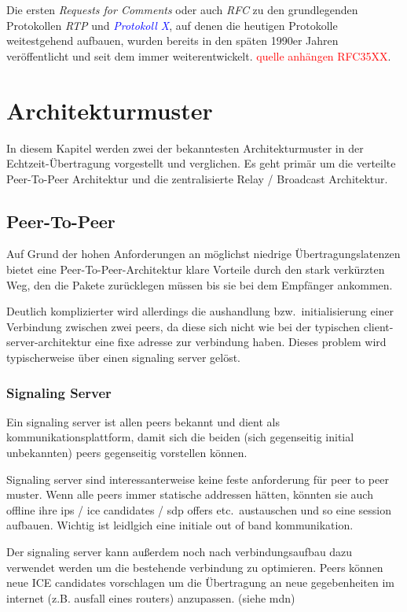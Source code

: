 \documentclass{article}
\begin{document}
\begin{onecolumn}
Die ersten \textit{Requests for Comments} oder auch \textit{RFC} zu
den grundlegenden Protokollen \textit{RTP} und
\textit{\textcolor{blue}{Protokoll X}}, auf denen die heutigen Protokolle
weitestgehend aufbauen, wurden bereits in den späten 1990er Jahren
veröffentlicht und seit dem immer weiterentwickelt. \textcolor{red}{quelle
anhängen RFC35XX}.

\section{Architekturmuster}

In diesem Kapitel werden zwei der bekanntesten Architekturmuster in der
Echtzeit-Übertragung vorgestellt und verglichen. Es geht primär um die
verteilte Peer-To-Peer Architektur und die zentralisierte Relay / Broadcast
Architektur.

\subsection{Peer-To-Peer}

Auf Grund der hohen Anforderungen an möglichst niedrige Übertragungslatenzen
bietet eine Peer-To-Peer-Architektur klare Vorteile durch den stark verkürzten
Weg, den die Pakete zurücklegen müssen bis sie bei dem Empfänger ankommen.

Deutlich komplizierter wird allerdings die aushandlung bzw.\ initialisierung
einer Verbindung zwischen zwei peers, da diese sich nicht wie bei der typischen
client-server-architektur eine fixe adresse zur verbindung haben. Dieses
problem wird typischerweise über einen signaling server gelöst.

\subsubsection{Signaling Server}
Ein signaling server ist allen peers bekannt und dient als
kommunikationsplattform, damit sich die beiden (sich gegenseitig initial
unbekannten) peers gegenseitig vorstellen können.

Signaling server sind interessanterweise keine feste anforderung für peer to
peer muster. Wenn alle peers immer statische addressen hätten, könnten sie auch
offline ihre ips / ice candidates / sdp offers etc.\ austauschen und so eine
session aufbauen. Wichtig ist leidlgich eine initiale out of band
kommunikation.

Der signaling server kann außerdem noch nach verbindungsaufbau dazu verwendet
werden um die bestehende verbindung zu optimieren. Peers können neue ICE
candidates vorschlagen um die Übertragung an neue gegebenheiten im internet
(z.B. ausfall eines routers) anzupassen. (siehe mdn)


\end{onecolumn}
\end{document}

